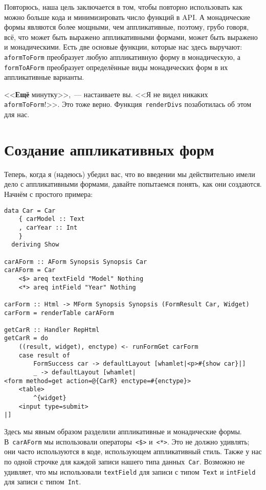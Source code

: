 Повторюсь, наша цель заключается в том, чтобы повторно использовать как можно
больше кода и минимизировать число функций в API. А монадические формы
являются более мощными, чем аппликативные, поэтому, грубо говоря, всё, что
может быть выражено аппликативными формами, может быть выражено и
монадическими. Есть две основые функции, которые нас здесь выручают:
\lstinline'aformToForm' преобразует любую аппликативную форму в монадическую,
а \lstinline'formToAForm' преобразует определённые виды монадических форм в их
аппликативные варианты.

<<\textbf{Ещё} минутку>>,~--- настаиваете вы. <<Я не видел никаких
\lstinline'aformToForm'!>>. Это тоже верно.  Функция~\lstinline'renderDivs'
позаботилась об этом для нас.

\section{Создание аппликативных форм}
Теперь, когда я (надеюсь) убедил вас, что во введении мы действительно имели
дело с аппликативными формами, давайте попытаемся понять, как они создаются.
Начнём с простого примера:

\begin{lstlisting}
data Car = Car
    { carModel :: Text
    , carYear :: Int
    }
  deriving Show

carAForm :: AForm Synopsis Synopsis Car
carAForm = Car
    <$> areq textField "Model" Nothing
    <*> areq intField "Year" Nothing

carForm :: Html -> MForm Synopsis Synopsis (FormResult Car, Widget)
carForm = renderTable carAForm

getCarR :: Handler RepHtml
getCarR = do
    ((result, widget), enctype) <- runFormGet carForm
    case result of
        FormSuccess car -> defaultLayout [whamlet|<p>#{show car}|]
        _ -> defaultLayout [whamlet|
<form method=get action=@{CarR} enctype=#{enctype}>
    <table>
        ^{widget}
    <input type=submit>
|]
\end{lstlisting}

Здесь мы явным образом разделили аппликативные и монадические формы.
В~\lstinline'carAForm' мы использовали операторы~\lstinline'<$>'
и~\lstinline'<*>'. Это не должно удивлять; они часто используются в коде,
использующем аппликативный стиль. Также у нас по одной строчке для каждой
записи нашего типа данных~\lstinline'Car'. Возможно не удивляет, что мы
использовали \lstinline'textField' для записи с типом~\lstinline'Text' и
\lstinline'intField' для записи с типом~\lstinline'Int'.

